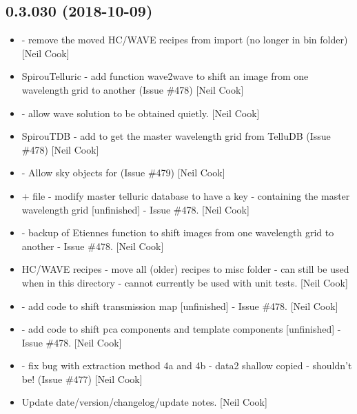 \documentclass[a4paper,10pt,english]{report}
\begin{document}
\subsection{0.3.030 (2018-10-09)}
\label{\detokenize{misc/changelog:id301}}\begin{itemize}
\item {} 
 - remove the moved HC/WAVE recipes from import
(no longer in bin folder) {[}Neil Cook{]}

\item {} 
SpirouTelluric - add function wave2wave to shift an image from one
wavelength grid to another (Issue \#478) {[}Neil Cook{]}

\item {} 
 - allow wave solution to be obtained quietly. {[}Neil
Cook{]}

\item {} 
SpirouTDB - add  to get the master wavelength
grid from TelluDB (Issue \#478) {[}Neil Cook{]}

\item {} 
 - Allow sky objects for  (Issue
\#479) {[}Neil Cook{]}

\item {} 
 + file - modify master telluric database to
have a  key - containing the master wavelength grid
{[}unfinished{]} - Issue \#478. {[}Neil Cook{]}

\item {} 
 - backup of Etiennes function to shift images from one
wavelength grid to another - Issue \#478. {[}Neil Cook{]}

\item {} 
HC/WAVE recipes - move all (older) recipes to misc folder - can still
be used when in this directory - cannot currently be used with unit
tests. {[}Neil Cook{]}

\item {} 
 - add code to shift transmission map {[}unfinished{]} -
Issue \#478. {[}Neil Cook{]}

\item {} 
 - add code to shift pca components and template
components {[}unfinished{]} - Issue \#478. {[}Neil Cook{]}

\item {} 
 - fix bug with extraction method 4a and 4b -
data2 shallow copied - shouldn’t be! (Issue \#477) {[}Neil Cook{]}

\item {} 
Update date/version/changelog/update notes. {[}Neil Cook{]}

\end{itemize}
\end{document}
